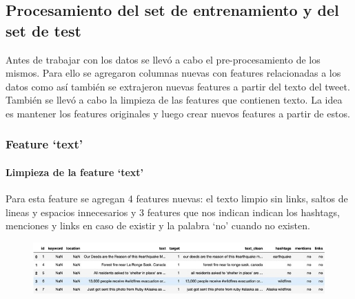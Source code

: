 \documentclass[12pt]{article}
\begin{document}
\subsection{Procesamiento del set de entrenamiento y del set de test}
Antes de trabajar con los datos se llevó a cabo el pre-procesamiento de los mismos.
Para ello se agregaron columnas nuevas con features relacionadas a los datos como así también se extrajeron nuevas features a partir del texto del tweet.
También se llevó a cabo la limpieza de las features que contienen texto.
La idea es mantener los features originales y luego crear nuevos features a partir de estos.


\subsubsection{Feature ‘text’}
\paragraph{Limpieza de la feature ‘text’\\}

Para esta feature se agregan 4 features nuevas: el texto limpio sin links, saltos de lineas y espacios innecesarios y 3 features que nos indican indican los hashtags, menciones y links en caso de existir y la palabra ‘no’ cuando no existen. 

\begin{figure}[H]
    \centering
    \includegraphics[scale = 0.9]{imgs/table_1.jpg}
    \label{tp:fig:location}
\end{figure}
\end{document}
